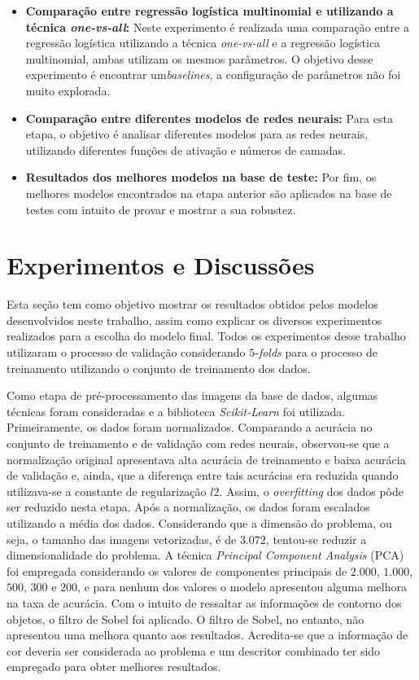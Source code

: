 \documentclass[conference]{IEEEtran}
\begin{document}
\begin{itemize}
	\item \small \textbf{Comparação entre regressão logística multinomial e utilizando a técnica \emph{one-vs-all}:} Neste experimento é realizada uma comparação entre a regressão logística utilizando a técnica \emph{one-vs-all} e a regressão logística multinomial, ambas utilizam os mesmos parâmetros. O objetivo desse experimento é encontrar um\emph{baselines}, a configuração de parâmetros não foi muito explorada.
	
	\item \small \textbf{Comparação entre diferentes modelos de redes neurais:} Para esta etapa, o objetivo é analisar diferentes modelos para as redes neurais, utilizando diferentes funções de ativação e números de camadas.  
	
	\item \small \textbf{Resultados dos melhores modelos na base de teste:} Por fim, os melhores modelos encontrados na etapa anterior são aplicados na base de testes com intuito de provar e mostrar a sua robustez.
\end{itemize}

\section{Experimentos e Discussões} \label{sec:exp}

Esta seção tem como objetivo mostrar os resultados obtidos pelos modelos desenvolvidos neste trabalho, assim como explicar os diversos experimentos realizados para a escolha do modelo final. Todos os experimentos desse trabalho utilizaram o processo de validação considerando $5$-\emph{folds} para o processo de treinamento utilizando o conjunto de treinamento dos dados. 

Como etapa de pré-processamento das imagens da base de dados, algumas técnicas foram consideradas e a biblioteca \emph{Scikit-Learn} foi utilizada. Primeiramente, os dados foram normalizados. Comparando a acurácia no conjunto de treinamento e de validação com redes neurais, observou-se que a normalização original apresentava alta acurácia de treinamento e baixa acurácia de validação e, ainda, que a diferença entre tais acurácias era reduzida quando utilizava-se a constante de regularização $l2$. Assim, o \emph{overfitting} dos dados pôde ser reduzido nesta etapa. Após a normalização, os dados foram escalados utilizando a média dos dados. Considerando que a dimensão do problema, ou seja, o tamanho das imagens vetorizadas, é de $3.072$, tentou-se reduzir a dimensionalidade do problema. A técnica \emph{Principal Component Analysis} (PCA) foi empregada considerando os valores de componentes principais de $2.000$, $1.000$, $500$, $300$ e $200$, e para nenhum dos valores o modelo apresentou alguma melhora na taxa de acurácia. Com o intuito de ressaltar as informações de contorno dos objetos, o filtro de Sobel foi aplicado. O filtro de Sobel, no entanto, não apresentou uma melhora quanto aos resultados. Acredita-se que a informação de cor deveria ser considerada ao problema e um descritor combinado ter sido empregado para obter melhores resultados.
\end{document}
